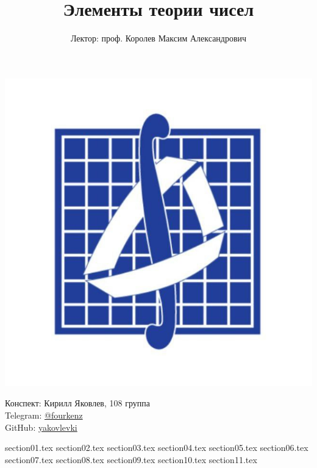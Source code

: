 \documentclass[a4paper, 12pt]{article}
\title{\textbf{Элементы теории чисел}}
\author{Лектор: проф. Королев Максим Александрович}
\theoremstyle{definition}
\begin{document}
    
    \fontsize{14pt}{20pt}\selectfont
    \maketitle
    \vspace{0.3cm}
    \begin{center}
        \includegraphics[width=0.75\linewidth]{Pictures/mehmat.png}
    \end{center}
    \vspace{1.5cm}
    \begin{center}
        Конспект: Кирилл Яковлев, 108 группа\\
        Telegram: \href{https://t.me/fourkenz}{@fourkenz}\\
        GitHub: \href{https://github.com/yakovlevki}{yakovlevki}\\
    \end{center}
        
    \newpage
    \tableofcontents
    \fontsize{14pt}{20pt}\selectfont
    \newpage

    {section01.tex}
    {section02.tex}
    {section03.tex}
    {section04.tex}
    {section05.tex}
    {section06.tex}
    {section07.tex}
    {section08.tex}
    {section09.tex}
    {section10.tex}
    {section11.tex}

    
\end{document}
